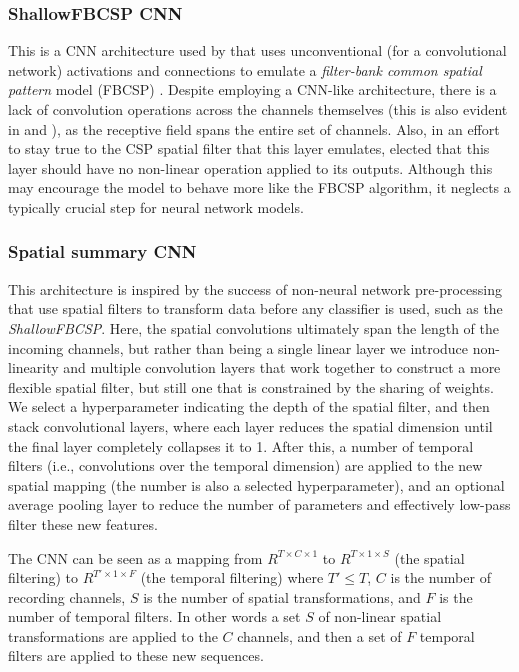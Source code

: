 \documentclass[utf8]{frontiersSCNS} %
\begin{document}
\subsubsection{ShallowFBCSP CNN}

This is a CNN architecture used by \cite{Schirrmeister2017} that uses unconventional (for a convolutional network) activations and connections to emulate a \emph{filter-bank common spatial pattern} model (FBCSP) \cite{KaiKengAng2008}. Despite employing a CNN-like architecture, there is a lack of convolution operations across the channels themselves (this is also evident in \cite{Lawhern2017} and \cite{Sun}), as the receptive field spans the entire set of channels. Also, in an effort to stay true to the CSP spatial filter that this layer emulates, \cite{Schirrmeister2017} elected that this layer should have no non-linear operation applied to its outputs. Although this may encourage the model to behave more like the FBCSP algorithm, it neglects a typically crucial step for neural network models.

\subsubsection{Spatial summary CNN} \label{sec:scnn}

This architecture is inspired by the success of non-neural network pre-processing that use spatial filters to transform data before any classifier is used, such as the \emph{ShallowFBCSP}. Here, the spatial convolutions ultimately span the length of the incoming channels, but rather than being a single linear layer we introduce non-linearity and multiple convolution layers that work together to construct a more flexible spatial filter, but still one that is constrained by the sharing of weights. We select a hyperparameter indicating the depth of the spatial filter, and then stack convolutional layers, where each layer reduces the spatial dimension until the final layer completely collapses it to 1. After this, a number of temporal filters (i.e., convolutions over the temporal dimension) are applied to the new spatial mapping (the number is also a selected hyperparameter), and an optional average pooling layer to reduce the number of parameters and effectively low-pass filter these new features.

The CNN can be seen as a mapping from $R^{T \times C \times 1}$ to $R^{T \times 1 \times S}$ (the spatial filtering) to $R^{T' \times 1 \times F }$ (the temporal filtering) where $T' \leq T$, $C$ is the number of recording channels, $S$ is the number of spatial transformations, and $F$ is the number of temporal filters. In other words a set $S$ of non-linear spatial transformations are applied to the $C$ channels, and then a set of $F$ temporal filters are applied to these new sequences. 
\end{document}
